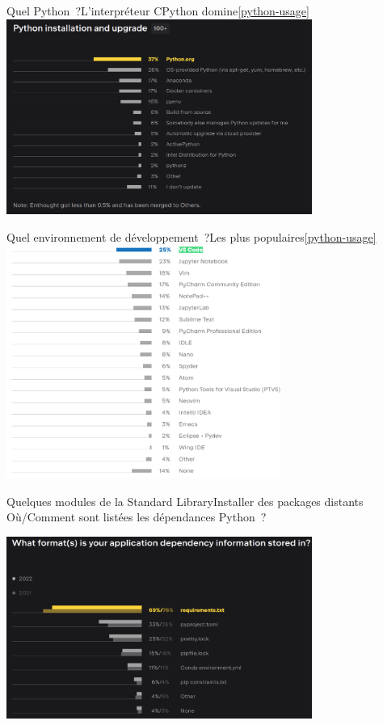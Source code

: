 \documentclass{beamer}
\begin{document}
    \begin{frame}{Quel Python~?}{L'interpréteur CPython domine\cref{python-usage}}
        \centering
        \includegraphics[width=10cm]{image/survey-install}
    \end{frame}

    \begin{frame}{Quel environnement de développement~?}{Les plus populaires\cref{python-usage}}
        \centering
        \includegraphics[width=9cm]{image/survey-ides}
    \end{frame}

    \begin{frame}{Quelques modules de la Standard Library}{Installer des packages distants}
        Où/Comment sont listées les dépendances Python~?
        \begin{center}
            \includegraphics[width=10cm]{image/survey_dependency_listing}
        \end{center}
    \end{frame}
\end{document}
